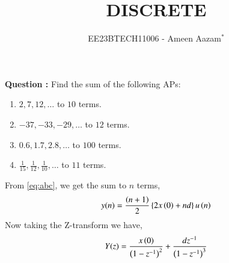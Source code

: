\documentclass[journal,12pt,twocolumn]{IEEEtran}
\theoremstyle{remark}
\begin{document}

\vspace{3cm}

\title{DISCRETE}
\author{EE23BTECH11006 - Ameen Aazam$^{*}$%
}
\maketitle
\newpage
\bigskip

\renewcommand{\thefigure}{\theenumi}
\renewcommand{\thetable}{\theenumi}

\vspace{3cm}
\textbf{Question :}
Find the sum of the following APs:
\begin{enumerate}[label=(\alph*)]
\item $2, 7, 12, \ldots$ to $10$ terms.
\item $-37, -33, -29, \ldots$ to $12$ terms.
\item $0.6, 1.7, 2.8, \ldots$ to $100$ terms.
\item $\frac{1}{15}, \frac{1}{12}, \frac{1}{10}, \ldots$ to $11$ terms.
\end{enumerate}
\solution

From \eqref{eq:abc}, we get the sum to $n$ terms,
\begin{align}
    y(n)=\frac{\left(n+1\right)}{2}\left\{2x\left(0\right)+nd\right\}u\left(n\right)
\end{align}
Now taking the Z-transform we have,
\begin{align}
    Y(z)=\frac{x\left(0\right)}{\left(1-z^{-1}\right)^2}+\frac{dz^{-1}}{\left(1-z^{-1}\right)^3}
\end{align}
\end{document}
